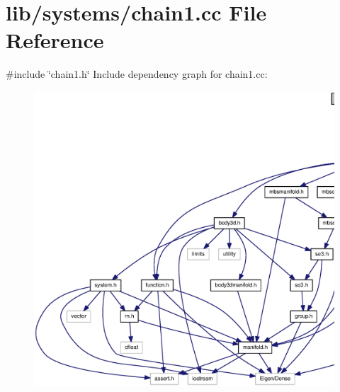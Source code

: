 \section{lib/systems/chain1.cc \-File \-Reference}
\label{chain1_8cc}
{\ttfamily \#include \char`\"{}chain1.\-h\char`\"{}}\*
\-Include dependency graph for chain1.\-cc\-:
\nopagebreak
\begin{figure}[H]
\begin{center}
\leavevmode
\includegraphics[width=350pt]{chain1_8cc__incl}
\end{center}
\end{figure}

